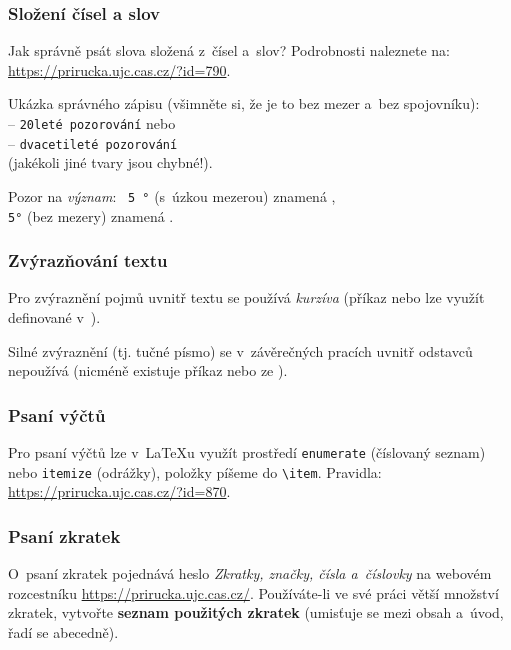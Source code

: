 \subsubsection*{Složení čísel a slov}
Jak správně psát slova složená z~čísel a~slov? Podrobnosti naleznete na: \url{https://prirucka.ujc.cas.cz/?id=790}.\par
Ukázka správného zápisu  (všimněte si, že je to bez mezer a~bez spojovníku):\\
-- {\tt 20leté pozorování} nebo\\
-- {\tt dvacetileté pozorování}\\
(jakékoli jiné tvary jsou chybné!).
\par\vspace{-3mm}
\begin{tabbing}
Pozor na \textit{význam}: \ \= {\tt 5\,°} (s~úzkou mezerou) znamená ,\\ \> {\tt 5°} (bez mezery) znamená .
\end{tabbing}


\subsubsection*{Zvýrazňování textu}
Pro zvýraznění pojmů uvnitř textu se používá \textit{kurzíva} (příkaz  nebo lze využít  definované v~).\par 
Silné zvýraznění (tj. tučné písmo) se v~závěrečných pracích uvnitř odstavců nepoužívá (nicméně existuje příkaz  nebo   ze ).


\subsubsection*{Psaní výčtů}
Pro psaní výčtů lze v~\LaTeX{u} využít prostředí {\tt enumerate} (číslovaný seznam) nebo {\tt itemize} (odrážky), položky píšeme do {\tt \textbackslash item}. Pravidla: \url{https://prirucka.ujc.cas.cz/?id=870}.


\subsubsection*{Psaní zkratek}
O~psaní zkratek pojednává heslo \textit{Zkratky, značky, čísla a~číslovky} na webovém rozcestníku \url{https://prirucka.ujc.cas.cz/}.
Používáte-li ve své práci větší množství zkratek, vytvořte \textbf{seznam použitých zkratek} (umisťuje se mezi obsah a~úvod, řadí se abecedně).



